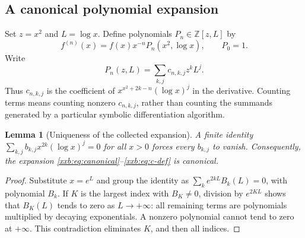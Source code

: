 \documentclass[11pt,a4paper]{article}
\numberwithin{equation}{section}
\newtheorem{lemma}[theorem]{Lemma}
\theoremstyle{definition}
\theoremstyle{remark}
\theoremstyle{plain}
\newcommand{\Z}{\mathbb Z}
\begin{document}
\subsection{A canonical polynomial expansion}\label{xxb:sec:canonical}
Set $z=x^2$ and $L=\log x$. Define polynomials $P_n\in\Z[z,L]$ by
\begin{equation}\label{xxb:eq:canonical}
 f^{(n)}(x)=f(x)x^{-n}P_n(x^2,\log x),\qquad P_0=1.
\end{equation}
Write
\begin{equation}\label{xxb:eq:c-def}
 P_n(z,L)=\sum_{k,j}c_{n,k,j}z^kL^j.
\end{equation}
Thus $c_{n,k,j}$ is the coefficient of
$x^{x^2+2k-n}(\log x)^j$ in the derivative. Counting terms means counting
nonzero $c_{n,k,j}$, rather than counting the summands generated by a
particular symbolic differentiation algorithm.

\begin{lemma}[Uniqueness of the collected expansion]\label{xxb:lem:unique}
A finite identity $\sum_{k,j}b_{k,j}x^{2k}(\log x)^j=0$ for all $x>0$
forces every $b_{k,j}$ to vanish. Consequently, the expansion
\eqref{xxb:eq:canonical}--\eqref{xxb:eq:c-def} is canonical.
\end{lemma}
\begin{proof}
Substitute $x=e^L$ and group the identity as
$\sum_k e^{2kL}B_k(L)=0$, with polynomial $B_k$. If $K$ is the largest
index with $B_K\ne0$, division by $e^{2KL}$ shows that $B_K(L)$ tends to
zero as $L\to+\infty$: all remaining terms are polynomials multiplied by
decaying exponentials. A nonzero polynomial cannot tend to zero at
$+\infty$. This contradiction eliminates $K$, and then all indices.
\end{proof}
\end{document}
